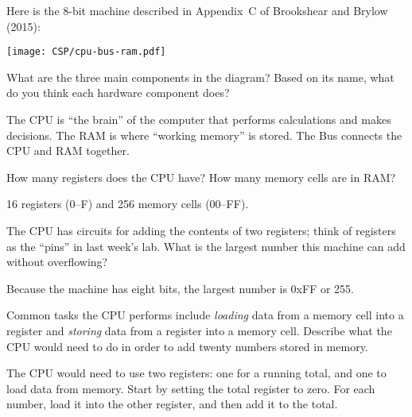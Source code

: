 \label{CSP/architecture}

Here is the 8-bit machine described in Appendix~C of Brookshear and Brylow (2015):

\begin{center}
\texttt{[image: CSP/cpu-bus-ram.pdf]}
\end{center}




\Q What are the three main components in the diagram?
Based on its name, what do you think each hardware component does?

\begin{answer}
The CPU is ``the brain'' of the computer that performs calculations and makes decisions.
The RAM is where ``working memory'' is stored.
The Bus connects the CPU and RAM together.
\end{answer}


\Q How many registers does the CPU have? How many memory cells are in RAM?

\begin{answer}[3em]
16 registers (0--F) and 256 memory cells (00--FF).
\end{answer}


\Q The CPU has circuits for adding the contents of two registers; think of registers as the ``pins'' in last week's lab.
What is the largest number this machine can add without overflowing?

\begin{answer}
Because the machine has eight bits, the largest number is 0xFF or 255.
\end{answer}


\Q Common tasks the CPU performs include \emph{loading} data from a memory cell into a register and \emph{storing} data from a register into a memory cell.
Describe what the CPU would need to do in order to add twenty numbers stored in memory.

\begin{answer}[7em]
The CPU would need to use two registers: one for a running total, and one to load data from memory.
Start by setting the total register to zero.
For each number, load it into the other register, and then add it to the total.
\end{answer}
